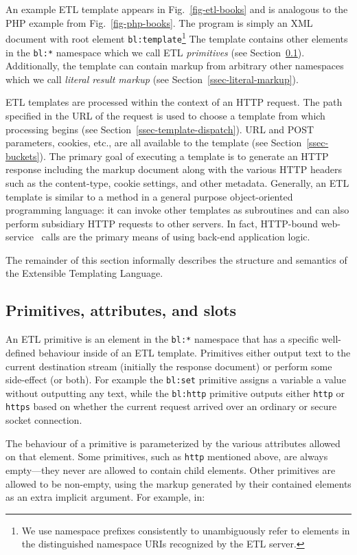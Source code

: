 \documentclass{www2003-submission}
\newcommand{\smtexttt}[1]{{\small\texttt{#1}}}
\newcommand{\ns}[1]{{\small\texttt{#1:*}}}
\newcommand{\figref}[1]{Fig.~\ref{fig-#1}}
\newcommand{\ssecref}[1]{Section~\ref{ssec-#1}}
\begin{document}
An example ETL template appears in \figref{etl-books} and is analogous
to the PHP example from \figref{php-books}.  The program is simply an
XML document with root element \smtexttt{bl:template}\footnote{We use
namespace prefixes consistently to unambiguously refer to elements in
the distinguished namespace URIs recognized by the ETL server.}  The
template contains other elements in the \ns{bl} namespace which we
call ETL \emph{primitives} (see \ssecref{primitives}).  Additionally,
the template can contain markup from arbitrary other namespaces which
we call \emph{literal result markup} (see \ssecref{literal-markup}).

ETL templates are processed within the context of an HTTP request.
The path specified in the URL of the request is used to choose a
template from which processing begins (see
\ssecref{template-dispatch}).  URL and POST parameters, cookies, etc.,
are all available to the template (see
\ssecref{buckets}). The primary goal of executing a template is to
generate an HTTP response including the markup document along with the
various HTTP headers such as the content-type, cookie settings, and
other metadata.  Generally, an ETL template is similar to a method in
a general purpose object-oriented programming language: it can invoke
other templates as subroutines and can also perform subsidiary HTTP
requests to other servers.  In fact, HTTP-bound
web-service~\cite{WebServices} calls are the primary means of using
back-end application logic.

The remainder of this section informally describes the structure and
semantics of the Extensible Templating Language.


\subsection{Primitives, attributes, and slots}
\label{ssec-primitives}

An ETL primitive is an element in the \ns{bl} namespace that has a
specific well-defined behaviour inside of an ETL template.  Primitives
either output text to the current destination stream (initially the
response document) or perform some side-effect (or both).  For example
the \smtexttt{bl:set} primitive assigns a variable a value without
outputting any text, while the
\smtexttt{bl:http} primitive outputs either \smtexttt{http} or
\smtexttt{https} based on whether the current request arrived over an
ordinary or secure socket connection.

The behaviour of a primitive is parameterized by the various
attributes allowed on that element.  Some primitives, such as
\smtexttt{http} mentioned above, are always empty---they never are
allowed to contain child elements. 
Other primitives are allowed to be non-empty, using the markup generated
by their contained elements as an extra implicit argument.  For example,
in:
\end{document}
